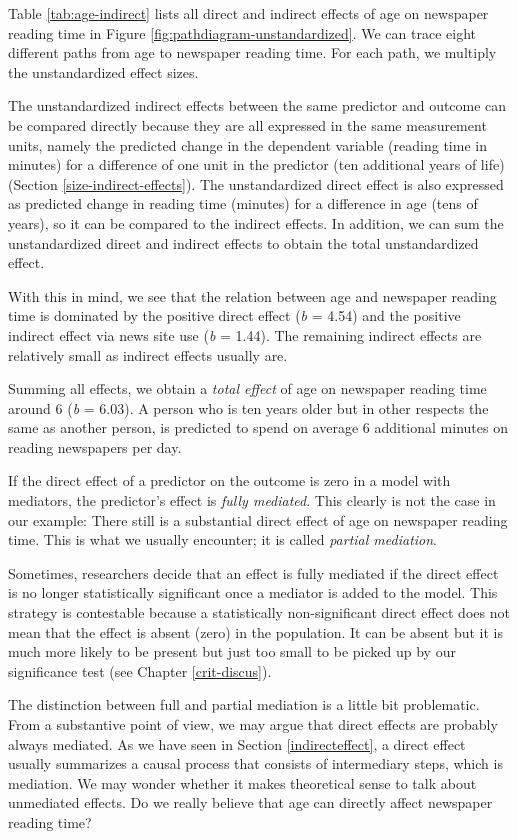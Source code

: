 \documentclass[a4paper]{book}
\theoremstyle{definition}
\theoremstyle{definition}
\theoremstyle{definition}
\theoremstyle{remark}
\begin{document}
Table \ref{tab:age-indirect} lists all direct and indirect effects of
age on newspaper reading time in Figure
\ref{fig:pathdiagram-unstandardized}. We can trace eight different paths
from age to newspaper reading time. For each path, we multiply the
unstandardized effect sizes.

The unstandardized indirect effects between the same predictor and
outcome can be compared directly because they are all expressed in the
same measurement units, namely the predicted change in the dependent
variable (reading time in minutes) for a difference of one unit in the
predictor (ten additional years of life) (Section
\ref{size-indirect-effects}). The unstandardized direct effect is also
expressed as predicted change in reading time (minutes) for a difference
in age (tens of years), so it can be compared to the indirect effects.
In addition, we can sum the unstandardized direct and indirect effects
to obtain the total unstandardized effect.

With this in mind, we see that the relation between age and newspaper
reading time is dominated by the positive direct effect (\emph{b} =
4.54) and the positive indirect effect via news site use (\emph{b} =
1.44). The remaining indirect effects are relatively small as indirect
effects usually are.

Summing all effects, we obtain a \emph{total effect} of age on newspaper
reading time around 6 (\emph{b} = 6.03). A person who is ten years older
but in other respects the same as another person, is predicted to spend
on average 6 additional minutes on reading newspapers per day.

If the direct effect of a predictor on the outcome is zero in a model
with mediators, the predictor's effect is \emph{fully mediated}. This
clearly is not the case in our example: There still is a substantial
direct effect of age on newspaper reading time. This is what we usually
encounter; it is called \emph{partial mediation}.

Sometimes, researchers decide that an effect is fully mediated if the
direct effect is no longer statistically significant once a mediator is
added to the model. This strategy is contestable because a statistically
non-significant direct effect does not mean that the effect is absent
(zero) in the population. It can be absent but it is much more likely to
be present but just too small to be picked up by our significance test
(see Chapter \ref{crit-discus}).

The distinction between full and partial mediation is a little bit
problematic. From a substantive point of view, we may argue that direct
effects are probably always mediated. As we have seen in Section
\ref{indirecteffect}, a direct effect usually summarizes a causal
process that consists of intermediary steps, which is mediation. We may
wonder whether it makes theoretical sense to talk about unmediated
effects. Do we really believe that age can directly affect newspaper
reading time?
\end{document}
